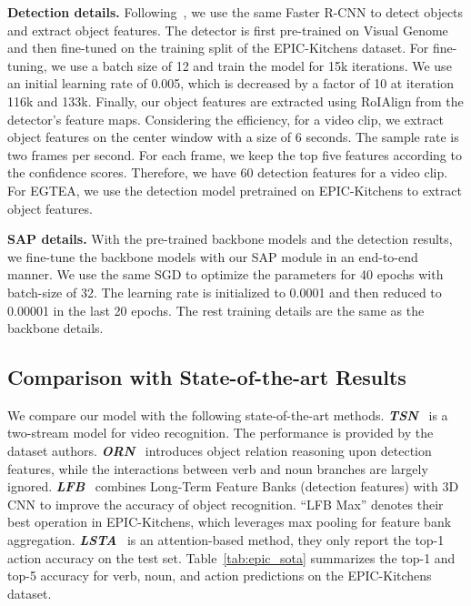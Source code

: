 \documentclass[letterpaper]{article} \usepackage{aaai20}  \usepackage{times}  \usepackage{helvet} \usepackage{courier}  \usepackage[hyphens]{url}  \usepackage{graphicx} \urlstyle{rm} \def\UrlFont{\rm}  \usepackage{graphicx}  \frenchspacing  \setlength{\pdfpagewidth}{8.5in}  \setlength{\pdfpageheight}{11in}  \usepackage{amsfonts,amssymb}
\begin{document}
\textbf{Detection details.} Following~\cite{Wu2018LongTermFB}, we use the same Faster R-CNN to detect objects and extract object features. 
The detector is first pre-trained on Visual Genome~\cite{Krishna2016VisualGC} and then fine-tuned on the training split of the EPIC-Kitchens dataset.
For fine-tuning, we use a batch size of 12 and train the model for 15k iterations.
We use an initial learning rate of 0.005, which is decreased by a factor of 10 at iteration 116k and 133k.
Finally, our object features are extracted using RoIAlign from the detector's feature maps.
Considering the efficiency, for a video clip, we extract object features on the center window with a size of 6 seconds.
The sample rate is two frames per second.
For each frame, we keep the top five features according to the confidence scores. 
Therefore, we have 60 detection features for a video clip. For EGTEA, we use the detection model pretrained on EPIC-Kitchens to extract object features.

\textbf{SAP details.}
With the pre-trained backbone models and the detection results, we fine-tune the backbone models with our SAP module in an end-to-end manner.
We use the same SGD to optimize the parameters for 40 epochs with batch-size of 32. The learning rate is initialized to 0.0001 and then reduced to 0.00001 in the last 20 epochs. The rest training details are the same as the backbone details.


\subsection{Comparison with State-of-the-art Results}
We compare our model with the following state-of-the-art methods. \textbf{\textit{TSN}}~\cite{price2019evaluation} is a two-stream model for video recognition. The performance is provided by the dataset authors. \textbf{\textit{ORN}}~\cite{Baradel2018ObjectLV} introduces object relation reasoning upon detection features, while the interactions between verb and noun branches are largely ignored.
\textbf{\textit{LFB}}~\cite{Wu2018LongTermFB} combines Long-Term Feature Banks (detection features) with 3D CNN to improve the accuracy of object recognition.
``LFB Max'' denotes their best operation in EPIC-Kitchens, which leverages max pooling for feature bank aggregation.
\textbf{\textit{LSTA}}~\cite{Sudhakaran_2019_CVPR} is an attention-based method, they only report the top-1 action accuracy on the test set.
Table~\ref{tab:epic_sota} summarizes the top-1 and top-5 accuracy for verb, noun, and action predictions on the {EPIC-Kitchens} dataset. 
\end{document}
